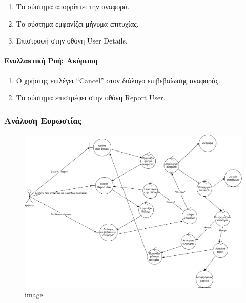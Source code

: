 \begin{enumerate}
\def\labelenumi{\arabic{enumi}.}
\setcounter{enumi}{8}
\tightlist
\item
  Το σύστημα απορρίπτει την αναφορά.
\item
  Το σύστημα εμφανίζει μήνυμα επιτυχίας.
\item
  Επιστροφή στην οθόνη User Details.
\end{enumerate}

\hypertarget{ux3b5ux3bdux3b1ux3bbux3bbux3b1ux3baux3c4ux3b9ux3baux3ae-ux3c1ux3bfux3ae-ux3b1ux3baux3cdux3c1ux3c9ux3c3ux3b7}{%
\paragraph{Εναλλακτική Ροή:
Ακύρωση}\label{ux3b5ux3bdux3b1ux3bbux3bbux3b1ux3baux3c4ux3b9ux3baux3ae-ux3c1ux3bfux3ae-ux3b1ux3baux3cdux3c1ux3c9ux3c3ux3b7}}

\begin{enumerate}
\def\labelenumi{\arabic{enumi}.}
\setcounter{enumi}{4}
\tightlist
\item
  Ο χρήστης επιλέγει ``Cancel'' στον διάλογο επιβεβαίωσης αναφοράς.
\item
  Το σύστημα επιστρέφει στην οθόνη Report User.
\end{enumerate}

\hypertarget{ux3b1ux3bdux3acux3bbux3c5ux3c3ux3b7-ux3b5ux3c5ux3c1ux3c9ux3c3ux3c4ux3afux3b1ux3c2}{%
\subsubsection{Ανάλυση
Ευρωστίας}\label{ux3b1ux3bdux3acux3bbux3c5ux3c3ux3b7-ux3b5ux3c5ux3c1ux3c9ux3c3ux3c4ux3afux3b1ux3c2}}

\begin{figure}
\centering
\includegraphics{./report-user-robustness.drawio.png}
\caption{image}
\end{figure}
